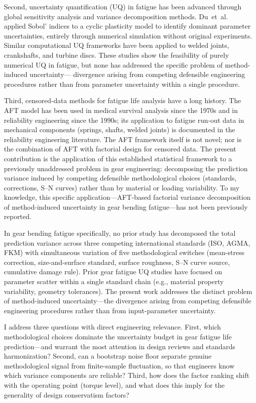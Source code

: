 \documentclass[twocolumn,12pt,a4paper]{article}
\begin{document}
Second, uncertainty quantification (UQ) in fatigue has been advanced
through global sensitivity analysis and variance decomposition methods.
Du~et~al.~\cite{du2022} applied Sobol' indices to a cyclic plasticity
model to identify dominant parameter
uncertainties, entirely through numerical simulation without original
experiments. Similar computational UQ frameworks have been applied to
welded joints, crankshafts, and turbine discs. These studies
show the feasibility of purely numerical UQ in fatigue, but none
has addressed the specific problem of method-induced uncertainty---%
divergence arising from competing defensible engineering procedures
rather than from parameter uncertainty within a single procedure.

Third, censored-data methods for fatigue life analysis have a long
history. The AFT model has been used in medical survival analysis since
the 1970s and in reliability engineering since the 1990s; its
application to fatigue run-out data in mechanical components (springs,
shafts, welded joints) is documented in the reliability engineering
literature. The AFT framework itself is not novel; nor is the
combination of AFT with factorial design for censored data. The
present contribution is the application of this established
statistical framework to a previously unaddressed problem in gear
engineering: decomposing the prediction variance induced by competing
defensible methodological choices (standards, corrections, S--N
curves) rather than by material or loading variability. To my
knowledge, this specific application---AFT-based factorial variance
decomposition of method-induced uncertainty in gear bending
fatigue---has not been previously reported.

In gear bending fatigue specifically, no prior study has decomposed the
total prediction variance across three competing international
standards (ISO, AGMA, FKM) with simultaneous variation of five
methodological switches (mean-stress correction, size-and-surface
standard, surface roughness, S--N curve source, cumulative damage
rule). Prior gear fatigue UQ studies have focused on parameter scatter
within a single standard chain (e.g., material property variability,
geometry tolerances). The present work addresses the distinct problem
of method-induced uncertainty---the divergence arising from competing
defensible engineering procedures rather than from input-parameter
uncertainty.

I address three questions with direct engineering relevance. First,
which methodological choices dominate the uncertainty budget in gear
fatigue life prediction---and warrant the most attention in
design reviews and standards harmonization? Second, can a bootstrap
noise floor separate genuine methodological signal from finite-sample
fluctuation, so that engineers know which variance components are
reliable? Third, how does the factor ranking shift with the operating
point (torque level), and what does this imply for the generality of
design conservatism factors?
\end{document}
